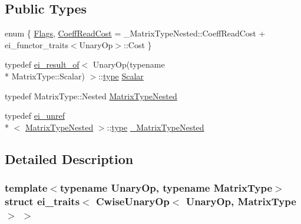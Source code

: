 \subsection*{Public Types}
\begin{DoxyCompactItemize}
\item 
enum \{ \hyperlink{structei__traits_3_01_cwise_unary_op_3_01_unary_op_00_01_matrix_type_01_4_01_4_a4cc48d92f5da40371900184ef7fcac6ba673bc648c37944d2781cd1db6cdba165}{Flags}, 
\hyperlink{structei__traits_3_01_cwise_unary_op_3_01_unary_op_00_01_matrix_type_01_4_01_4_a4cc48d92f5da40371900184ef7fcac6ba9ef3844c337eadfb1876b721cd541004}{Coeff\-Read\-Cost} = \-\_\-\-Matrix\-Type\-Nested\-:\-:Coeff\-Read\-Cost + ei\-\_\-functor\-\_\-traits$<$Unary\-Op$>$\-:\-:Cost
 \}
\item 
typedef \hyperlink{structei__result__of}{ei\-\_\-result\-\_\-of}$<$ Unary\-Op(typename \\*
Matrix\-Type\-::\-Scalar) $>$\-::\hyperlink{glext_8h_a7d05960f4f1c1b11f3177dc963a45d86}{type} \hyperlink{structei__traits_3_01_cwise_unary_op_3_01_unary_op_00_01_matrix_type_01_4_01_4_a591ec31d9fc065c8a43f65d9ead1493f}{Scalar}
\item 
typedef Matrix\-Type\-::\-Nested \hyperlink{structei__traits_3_01_cwise_unary_op_3_01_unary_op_00_01_matrix_type_01_4_01_4_a12560324ea835cf1da46c6d97489eb6e}{Matrix\-Type\-Nested}
\item 
typedef \hyperlink{structei__unref}{ei\-\_\-unref}\\*
$<$ \hyperlink{structei__traits_3_01_cwise_unary_op_3_01_unary_op_00_01_matrix_type_01_4_01_4_a12560324ea835cf1da46c6d97489eb6e}{Matrix\-Type\-Nested} $>$\-::\hyperlink{glext_8h_a7d05960f4f1c1b11f3177dc963a45d86}{type} \hyperlink{structei__traits_3_01_cwise_unary_op_3_01_unary_op_00_01_matrix_type_01_4_01_4_ab49cfa9426db6272a05759fe1494e0ee}{\-\_\-\-Matrix\-Type\-Nested}
\end{DoxyCompactItemize}


\subsection{Detailed Description}
\subsubsection*{template$<$typename Unary\-Op, typename Matrix\-Type$>$struct ei\-\_\-traits$<$ Cwise\-Unary\-Op$<$ Unary\-Op, Matrix\-Type $>$ $>$}



